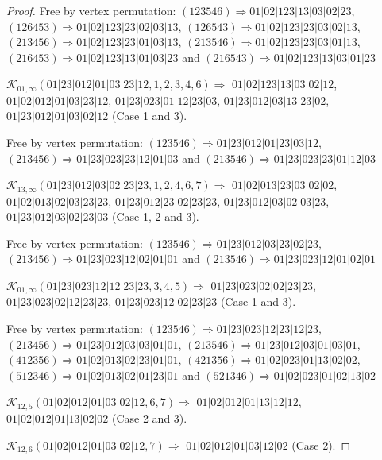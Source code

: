 \documentclass[12pt]{article}
\theoremstyle{plain}
\theoremstyle{definition}
\theoremstyle{remark}
\newcommand{\fancy}[1]{\mathcal{#1}}
\def\K{\fancy{K}}
\begin{document}
\begin{proof}
	
	
	Free by vertex permutation: $(1 2 3 5 4 6)\Rightarrow 01|02|123|13|03|02|23$, $(1 2 6 4 5 3)\Rightarrow 01|02|123|23|02|03|13$, $(1 2 6 5 4 3)\Rightarrow 01|02|123|23|03|02|13$, $(2 1 3 4 5 6)\Rightarrow 01|02|123|23|01|03|13$, $(2 1 3 5 4 6)\Rightarrow 01|02|123|23|03|01|13$, $(2 1 6 4 5 3)\Rightarrow 01|02|123|13|01|03|23$ and $(2 1 6 5 4 3)\Rightarrow 01|02|123|13|03|01|23$
	
	
	\bigskip
	
	$\K_{01,\infty}(01|23|012|01|03|23|12,1, 2, 3, 4, 6)\Rightarrow $ $01|02|123|13|03|02|12$, $01|02|012|01|03|23|12$, $01|23|023|01|12|23|03$, $01|23|012|03|13|23|02$, $01|23|012|01|03|02|12$ (Case 1 and 3).
	
	
	
	Free by vertex permutation: $(1 2 3 5 4 6)\Rightarrow 01|23|012|01|23|03|12$, $(2 1 3 4 5 6)\Rightarrow 01|23|023|23|12|01|03$ and $(2 1 3 5 4 6)\Rightarrow 01|23|023|23|01|12|03$
	
	
	\bigskip
	
	$\K_{13,\infty}(01|23|012|03|02|23|23,1, 2, 4, 6, 7)\Rightarrow $ $01|02|013|23|03|02|02$, $01|02|013|02|03|23|23$, $01|23|012|23|02|23|23$, $01|23|012|03|02|03|23$, $01|23|012|03|02|23|03$ (Case 1, 2 and 3).
	
	
	
	Free by vertex permutation: $(1 2 3 5 4 6)\Rightarrow 01|23|012|03|23|02|23$, $(2 1 3 4 5 6)\Rightarrow 01|23|023|12|02|01|01$ and $(2 1 3 5 4 6)\Rightarrow 01|23|023|12|01|02|01$
	
	
	\bigskip
	
	$\K_{01,\infty}(01|23|023|12|12|23|23,3, 4, 5)\Rightarrow $ $01|23|023|02|02|23|23$, $01|23|023|02|12|23|23$, $01|23|023|12|02|23|23$ (Case 1 and 3).
	
	
	
	Free by vertex permutation: $(1 2 3 5 4 6)\Rightarrow 01|23|023|12|23|12|23$, $(2 1 3 4 5 6)\Rightarrow 01|23|012|03|03|01|01$, $(2 1 3 5 4 6)\Rightarrow 01|23|012|03|01|03|01$, $(4 1 2 3 5 6)\Rightarrow 01|02|013|02|23|01|01$, $(4 2 1 3 5 6)\Rightarrow 01|02|023|01|13|02|02$, $(5 1 2 3 4 6)\Rightarrow 01|02|013|02|01|23|01$ and $(5 2 1 3 4 6)\Rightarrow 01|02|023|01|02|13|02$
	
	
	\bigskip
	
	$\K_{12,5}(01|02|012|01|03|02|12,6, 7)\Rightarrow $ $01|02|012|01|13|12|12$, $01|02|012|01|13|02|02$ (Case 2 and 3).
	
	$\K_{12,6}(01|02|012|01|03|02|12,7)\Rightarrow $ $01|02|012|01|03|12|02$ (Case 2).
	

\end{proof}
\end{document}
